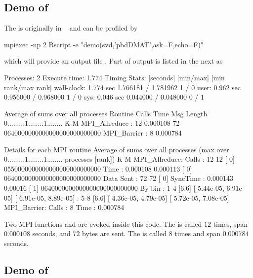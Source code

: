 \subsection{Demo of }

The  is originally in
~\citep{Schmidt2012pbdBASEpackage}
and can be profiled by
\begin{Code}
mpiexec -np 2 Rscript -e "demo(svd,'pbdDMAT',ask=F,echo=F)"
\end{Code}
which will provide an output file .
Part of output is listed in the next as
\begin{Output}
Processes:  2
Execute time:  1.774
Timing Stats: [seconds]	[min/max]    	[min rank/max rank]
wall-clock: 1.774 sec	1.766181 / 1.781962	1 / 0
user: 0.962 sec	0.956000 / 0.968000	1 / 0
sys: 0.046 sec	0.044000 / 0.048000	0 / 1

Average of sums over all processes
Routine                 Calls       Time Msg Length    %
0.........1........1........
K        M
MPI_Allreduce       :      12   0.000108         72 0640000000000000000000000000
MPI_Barrier         :       8   0.000784

Details for each MPI routine
Average of sums over all processes
(max over          0.........1........1........
 processes [rank])           K        M
MPI_Allreduce:
Calls     :         12           12 [   0] 0550000000000000000000000000
Time      :   0.000108     0.000113 [   0] 0640000000000000000000000000
Data Sent :         72           72 [   0]
SyncTime  :   0.000143      0.00016 [   1] 0640000000000000000000000000
By bin    : 1-4	[6,6]	[  5.44e-05,  6.91e-05]	[  6.91e-05,  8.89e-05]
: 5-8	[6,6]	[  4.36e-05,  4.79e-05]	[  5.72e-05,  7.08e-05]
MPI_Barrier:
Calls     :          8
Time      :   0.000784

\end{Output}
Two MPI  functions  and  are
evoked inside this  code. The  is called $12$
times, span $0.000108$ seconds, and $72$ bytes are sent.
The  is called $8$ times and span $0.000784$ seconds.



\subsection{Demo of }

